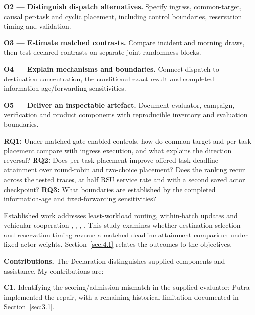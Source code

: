 \documentclass[12pt,a4paper]{article}
\begin{document}
\textbf{O2 --- Distinguish dispatch alternatives.} Specify ingress, common-target, causal per-task and cyclic placement, including control boundaries, reservation timing and validation.

\textbf{O3 --- Estimate matched contrasts.} Compare incident and morning draws, then test declared contrasts on separate joint-randomness blocks.

\textbf{O4 --- Explain mechanisms and boundaries.} Connect dispatch to destination concentration, the conditional exact result and completed information-age/forwarding sensitivities.

\textbf{O5 --- Deliver an inspectable artefact.} Document evaluator, campaign, verification and product components with reproducible inventory and evaluation boundaries.

\textbf{RQ1:} Under matched gate-enabled controls, how do common-target and per-task placement compare with ingress execution, and what explains the direction reversal? \textbf{RQ2:} Does per-task placement improve offered-task deadline attainment over round-robin and two-choice placement? Does the ranking recur across the tested traces, at half RSU service rate and with a second saved actor checkpoint? \textbf{RQ3:} What boundaries are established by the completed information-age and fixed-forwarding sensitivities?

Established work addresses least-workload routing, within-batch updates and vehicular cooperation \cite{ref14}, \cite{ref16}, \cite{ref7}, \cite{ref8}. This study examines whether destination selection and reservation timing reverse a matched deadline-attainment comparison under fixed actor weights. Section~\ref{sec:4.1} relates the outcomes to the objectives.

\textbf{Contributions.} The Declaration distinguishes supplied components and assistance. My contributions are:

\textbf{C1.} Identifying the scoring/admission mismatch in the supplied evaluator; Putra implemented the repair, with a remaining historical limitation documented in Section~\ref{sec:3.1}.
\end{document}
